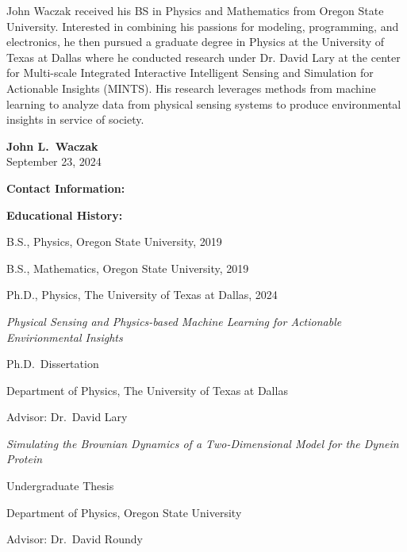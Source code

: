\documentclass[doublespacing]{utdthesis}
\begin{document}
\begin{biosketch}
  John Waczak received his BS in Physics and Mathematics from Oregon State
  University. Interested in combining his passions for modeling, programming,
  and electronics, he then pursued a graduate degree in Physics at the
  University of Texas at Dallas where he conducted research under Dr. David Lary
  at the center for Multi-scale Integrated Interactive Intelligent Sensing and
  Simulation for Actionable Insights (MINTS). His research leverages methods from
  machine learning to analyze data from physical sensing systems to produce
  environmental insights in service of society.
\end{biosketch}


\begin{vita}  %

  \begin{center}
    {\LARGE\bfseries John L.~Waczak} \\[5pt]
    September 23, 2024
  \end{center}

  \bigskip

  {\large\bfseries Contact Information:\par}
  \medskip
  \noindent{}
  \hfil{}\par

  \bigskip

  {\large\bfseries Educational History:\par}
  \medskip
  B.S., Physics, Oregon State University, 2019\par
  B.S., Mathematics, Oregon State University, 2019\par
  Ph.D., Physics, The University of Texas at Dallas, 2024\par
  \medskip
  \textit{Physical Sensing and Physics-based Machine Learning for Actionable
    Envirionmental Insights}\par
  Ph.D.~Dissertation\par
  Department of Physics, The University of Texas at Dallas\par
  Advisor: Dr.~David Lary\par
  \medskip
  \textit{Simulating the Brownian Dynamics of a Two-Dimensional Model for the
    Dynein Protein}\par
  Undergraduate Thesis\par
  Department of Physics, Oregon State University\par
  Advisor: Dr.~David Roundy


\end{vita}
\end{document}
